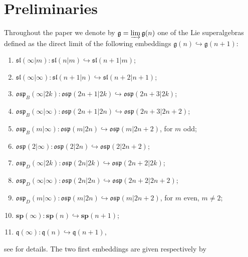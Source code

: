 \documentclass[12pt]{amsart}
\newcommand\g{\mathfrak{g}}
\newcommand\fq{\mathfrak{q}}
\newcommand\fsl{\mathfrak{sl}}
\newcommand\fosp{\mathfrak{osp}}
\newcommand\bsp{\mathbf{sp}}
\theoremstyle{plain}
\theoremstyle{definition}
\numberwithin{equation}{section}
\begin{document}
\section{Preliminaries}\label{sec:prel}

Throughout the paper we denote by $\g = \varinjlim \g(n)$ one of the  Lie superalgebras defined as the direct limit of the following embeddings $\g(n) \hookrightarrow \g(n+1)$:
\begin{enumerate}\label{def:dir.lim.superalg.}
\item \label{def:dir.lim.superalg.A1} $\fsl(\infty|m) : \fsl(n|m)\hookrightarrow \fsl(n+1|m)$;
\item \label{def:dir.lim.superalg.A2} $\fsl(\infty|\infty) : \fsl(n+1|n)\hookrightarrow \fsl(n+2|n+1)$;
\item \label{def:dir.lim.superalg.B1} $\fosp_B(\infty|2k) : \fosp(2n+1|2k)\hookrightarrow \fosp(2n+3|2k)$;
\item \label{def:dir.lim.superalg.B2} $\fosp_B(\infty|\infty) : \fosp(2n+1|2n)\hookrightarrow \fosp(2n+3|2n+2)$;
\item \label{def:dir.lim.superalg.B3} $\fosp_B(m|\infty) : \fosp(m|2n)\hookrightarrow \fosp(m|2n+2)$, for $m$ odd;
\item \label{def:dir.lim.superalg.C} $\fosp(2|\infty) : \fosp(2|2n)\hookrightarrow \fosp(2|2n+2)$;
\item \label{def:dir.lim.superalg.D1} $\fosp_D(\infty|2k) : \fosp(2n|2k)\hookrightarrow \fosp(2n+2|2k)$;
\item \label{def:dir.lim.superalg.D2} $\fosp_D(\infty|\infty) : \fosp(2n|2n)\hookrightarrow \fosp(2n+2|2n+2)$;
\item \label{def:dir.lim.superalg.D3} $\fosp_D(m|\infty) : \fosp(m|2n)\hookrightarrow \fosp(m|2n+2)$, for $m$ even, $m\neq 2$;
\item \label{def:dir.lim.superalg.p} $\bsp(\infty) : \bsp(n)\hookrightarrow \bsp(n+1)$;
\item \label{def:dir.lim.superalg.q} $\fq(\infty) : \fq(n)\hookrightarrow \fq(n+1)$,
\end{enumerate}
see \cite{Pen04} for details. The two first embeddings are given respectively by
\end{document}
